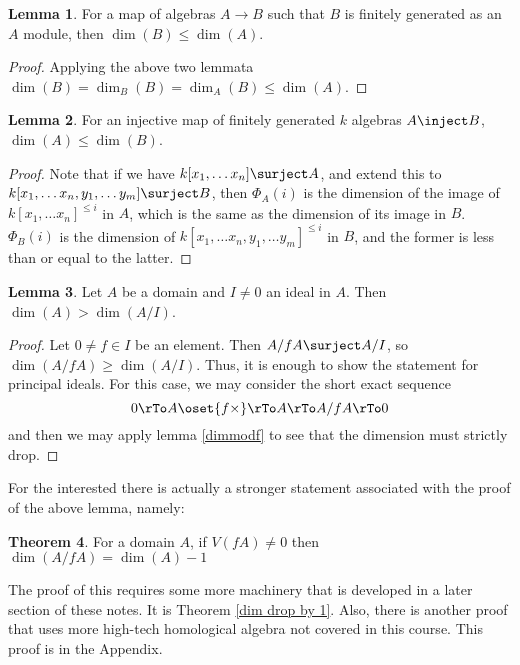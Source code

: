\documentclass[12 pt]{article}
\theoremstyle{definition}
\newtheorem{theorem}{Theorem}[section]
\newtheorem{lemma}[theorem]{Lemma}
\begin{document}
\begin{lemma} For a map of algebras $A \to B$ such that $B$ is finitely generated as an $A$ module, then $\dim(B) \leq \dim(A)$.
\end{lemma}
\begin{proof} Applying the above two lemmata $\dim(B)=\dim_B(B)=\dim_A(B) \leq \dim(A)$.
\end{proof}




\begin{lemma} For an injective map of finitely generated $k$ algebras $A \inject B$, $\dim(A) \leq \dim(B)$.
\end{lemma}
\begin{proof} Note that if we have $k[x_1, \ldots x_n] \surject A$, and extend this to $k[x_1, \ldots x_n, y_1, \ldots y_m] \surject B$, then $\Phi_A(i)$ is the dimension of the image of $k[x_1, \ldots x_n]^{\leq i}$ in $A$, which is the same as the dimension of its image in $B$. $\Phi_B(i)$ is the dimension of $k[x_1, \ldots x_n, y_1, \ldots y_m]^{\leq i}$ in $B$, and the former is less than or equal to the latter.
\end{proof}


\begin{lemma} Let $A$ be a domain and $I  \neq 0$ an ideal in $A$. Then $\dim(A) > \dim(A/I)$.
\label{hilb dim of quot ring drops}
\end{lemma}
\begin{proof} Let $0 \neq f \in I$ be an element. Then $A/fA \surject A/I$, so $\dim(A/fA) \geq \dim(A/I)$. Thus, it is enough to show the statement for principal ideals. For this case, we may consider the short exact sequence
\[ 0 \rTo A \oset{f \times}\rTo A \rTo A/fA \rTo 0\]
and then we may apply lemma \ref{dimmodf} to see that the dimension must strictly drop.
\end{proof}

For the interested there is actually a stronger statement associated with the proof of the above lemma, namely:

\begin{theorem} For a domain $A$, if $V(fA) \neq 0$ then $\dim(A/fA)=\dim(A)-1$
\label{dim drop by 1 v0}
\end{theorem}

The proof of this requires some more machinery that is developed in a later section of these notes. It is Theorem \ref{dim drop by 1}. Also, there is another proof that uses more high-tech homological algebra not covered in this course. This proof is in the Appendix.
\end{document}
